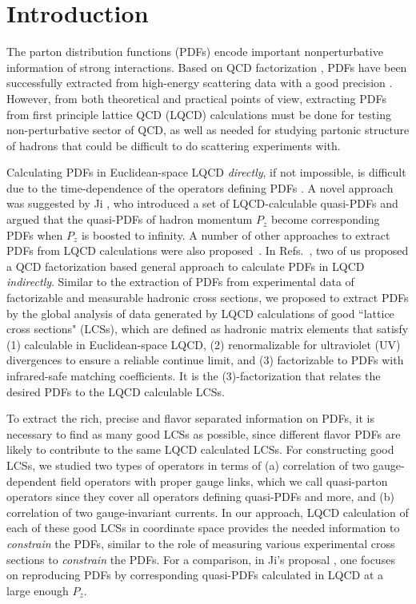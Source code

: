 \section{Introduction}
\label{sec:intro}
The parton distribution functions (PDFs) encode important nonperturbative information of strong interactions. Based on QCD factorization \cite{Collins:1989gx}, PDFs have been successfully extracted from high-energy scattering data with a good precision \cite{Lin:2017snn}. However, from both theoretical and practical points of view, extracting PDFs from first principle lattice QCD (LQCD) calculations must be done for testing non-perturbative sector of QCD, as well as needed for studying partonic structure of hadrons that could be difficult to do scattering experiments with.

Calculating PDFs in Euclidean-space LQCD {\it directly}, if not impossible, is difficult due to the time-dependence of the operators defining PDFs \cite{Lin:2017snn}.  A novel approach was suggested by Ji \cite{Ji:2013dva}, who introduced a set of LQCD-calculable quasi-PDFs and argued that the quasi-PDFs of hadron momentum $P_z$ become corresponding PDFs when $P_z$ is boosted to infinity. A number of other approaches to extract PDFs from LQCD calculations were also proposed~\cite{Liu:1993cv,Liu:1999ak,Liu:2016djw,Orginos:2017kos,Chambers:2017dov}. In Refs.~\cite{Ma:2014jla,Ma:2017pxb}, two of us proposed a QCD factorization based general approach to calculate PDFs in LQCD {\it indirectly}.
Similar to the extraction of PDFs from experimental data of factorizable and measurable hadronic cross sections, we proposed to
extract PDFs by the global analysis of data generated by LQCD calculations of good ``lattice cross sections" (LCSs), which are defined as hadronic matrix elements that satisfy (1) calculable in Euclidean-space LQCD, (2) renormalizable for ultraviolet (UV) divergences to ensure a reliable continue limit, and (3) factorizable to PDFs with infrared-safe matching coefficients. It is the (3)-factorization that relates the desired PDFs to the LQCD calculable LCSs.

To extract the rich, precise and flavor separated information on PDFs, it is necessary to find as many good LCSs as possible, since different flavor PDFs are likely to contribute to the same LQCD calculated LCSs.  For constructing good LCSs, we studied two types of operators in terms of (a) correlation of two gauge-dependent field operators with proper gauge links, which we call quasi-parton operators  since they cover all operators defining quasi-PDFs and more, and (b) correlation of two gauge-invariant currents. In our approach, LQCD calculation of each of these good LCSs in coordinate space provides the needed information to {\it constrain} the PDFs, similar to the role of measuring various experimental cross sections to {\it constrain} the PDFs. For a comparison, in Ji's proposal \cite{Ji:2013dva}, one focuses on reproducing PDFs by corresponding quasi-PDFs calculated in LQCD at a large enough $P_z$.



